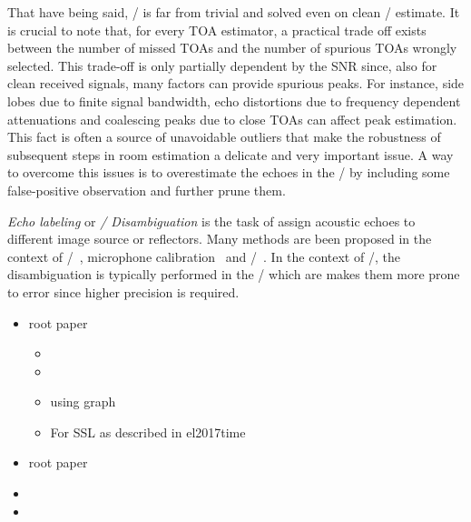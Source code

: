 \mynewline
That have being said, \AER/ is far from trivial and solved even on clean \RIR/ estimate.
It is crucial to note that, for every TOA estimator, a practical trade off exists between the number of missed TOAs and the number of spurious TOAs wrongly selected.
This trade-off is only partially dependent by the SNR since, also for clean received signals, many factors can provide spurious peaks.
For instance, side lobes due to finite signal bandwidth, echo distortions due to frequency dependent attenuations and coalescing peaks due to close TOAs can affect peak estimation.
This fact is often a source of unavoidable outliers that make the robustness of subsequent steps in room estimation a delicate and very important issue.
A way to overcome this issues is to overestimate the echoes in the \RIR/ by including some false-positive observation and further prune them.

\textit{Echo labeling} or \textit{\TOA/ Disambiguation} is the task of assign acoustic echoes to different image source or reflectors.
Many methods are been proposed in the context of \SSL/~, microphone calibration~\cite{parhizkar2014single,salvati2016sound}
and \RooGE/~.
In the context of \SSL/, the disambiguation is typically performed in the \TDOAs/ which are makes them more prone to error since higher precision is required.



\begin{itemize}
    \item {} root paper
    \begin{itemize}
        \item {}
        \item {}
        \item {} using graph
        \item For SSL as described in el2017time 
    \end{itemize}
    \item {} root paper
    \item {}
    \item {}
\end{itemize}


